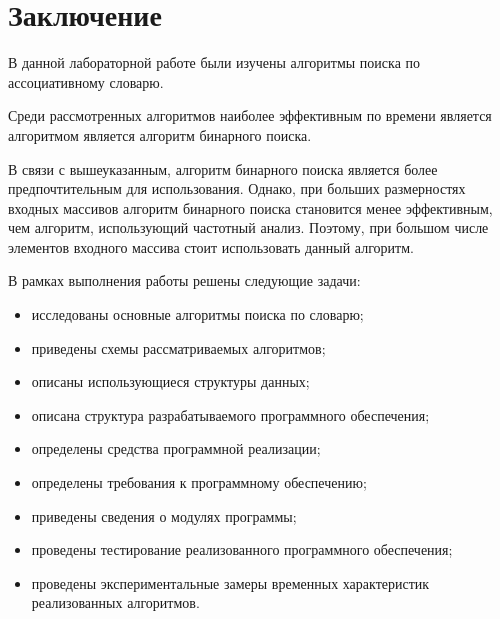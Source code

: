 \chapter*{Заключение}

В данной лабораторной работе были изучены алгоритмы поиска по ассоциативному словарю. 

Среди рассмотренных алгоритмов наиболее эффективным по времени является алгоритмом является алгоритм бинарного поиска. 

В связи с вышеуказанным, алгоритм бинарного поиска является более предпочтительным для использования. Однако, при больших размерностях входных массивов алгоритм бинарного поиска становится менее эффективным, чем алгоритм, использующий частотный анализ. Поэтому, при большом числе элементов входного массива стоит использовать данный алгоритм.

В рамках выполнения работы решены следующие задачи:
\begin{itemize}
	\item исследованы основные алгоритмы поиска по словарю;
	\item приведены схемы рассматриваемых алгоритмов;
	\item описаны использующиеся структуры данных;
	\item описана структура разрабатываемого программного обеспечения;
	\item определены средства программной реализации;
	\item определены требования к программному обеспечению;
	\item приведены сведения о модулях программы;
	\item проведены тестирование реализованного программного обеспечения;
	\item проведены экспериментальные замеры временных характеристик реализованных алгоритмов.
\end{itemize}
